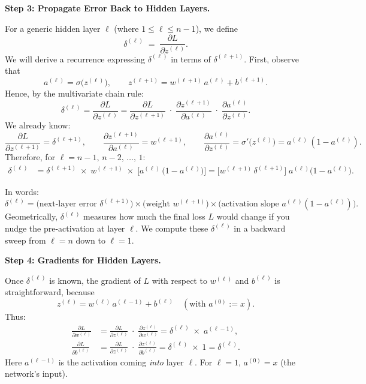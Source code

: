 \documentclass{article}
\begin{document}
\vspace{0.5em}
\noindent \textbf{Step 3: Propagate Error Back to Hidden Layers.}

For a generic hidden layer \(\ell\) (where \(1 \le \ell \le n-1\)), we define
\[
    \delta^{(\ell)} \;=\; \frac{\partial L}{\partial z^{(\ell)}}.
\]
We will derive a recurrence expressing \(\delta^{(\ell)}\) in terms of \(\delta^{(\ell+1)}\).  First, observe that
\[
    a^{(\ell)} = \sigma\bigl(z^{(\ell)}\bigr),
    \qquad
    z^{(\ell+1)} = w^{(\ell+1)}\,a^{(\ell)} + b^{(\ell+1)}.
\]
Hence, by the multivariate chain rule:
\[
    \delta^{(\ell)} 
    = \frac{\partial L}{\partial z^{(\ell)}} 
    = \frac{\partial L}{\partial z^{(\ell+1)}} 
      \;\cdot\; \frac{\partial z^{(\ell+1)}}{\partial a^{(\ell)}} 
      \;\cdot\; \frac{\partial a^{(\ell)}}{\partial z^{(\ell)}}.
\]
We already know:
\[
    \frac{\partial L}{\partial z^{(\ell+1)}} = \delta^{(\ell+1)}, 
    \qquad
    \frac{\partial z^{(\ell+1)}}{\partial a^{(\ell)}} 
    = w^{(\ell+1)},
    \qquad
    \frac{\partial a^{(\ell)}}{\partial z^{(\ell)}} 
    = \sigma'\bigl(z^{(\ell)}\bigr) 
    = a^{(\ell)}\,(1 - a^{(\ell)}).
\]
Therefore, for \(\ell = n-1,\,n-2,\,\dots,\,1\):
\begin{align}
    \delta^{(\ell)} 
    &= \delta^{(\ell+1)} \; \times\; w^{(\ell+1)} \; \times\; \bigl[a^{(\ell)}\,\bigl(1 - a^{(\ell)}\bigr)\bigr] 
    = \bigl[w^{(\ell+1)}\,\delta^{(\ell+1)}\bigr]\;a^{(\ell)}\bigl(1 - a^{(\ell)}\bigr).
    \label{eq:delta-hidden}
\end{align}

\noindent In words:
\[
    \delta^{(\ell)} = \bigl(\text{next-layer error } \delta^{(\ell+1)}\bigr) 
                     \times \bigl(\text{weight } w^{(\ell+1)}\bigr) 
                     \times \bigl(\text{activation slope } a^{(\ell)}(1 - a^{(\ell)})\bigr).
\]
Geometrically, \(\delta^{(\ell)}\) measures how much the final loss \(L\) would change if you nudge the pre-activation at layer \(\ell\).  We compute these \(\delta^{(\ell)}\) in a backward sweep from \(\ell = n\) down to \(\ell = 1\).

\vspace{0.5em}
\noindent \textbf{Step 4: Gradients for Hidden Layers.}

Once \(\delta^{(\ell)}\) is known, the gradient of \(L\) with respect to \(w^{(\ell)}\) and \(b^{(\ell)}\) is straightforward, because
\[
    z^{(\ell)} = w^{(\ell)}\,a^{(\ell-1)} + b^{(\ell)} \quad (\text{with }a^{(0)} := x).
\]
Thus:
\begin{align}
    \frac{\partial L}{\partial w^{(\ell)}} 
    &= \frac{\partial L}{\partial z^{(\ell)}} 
       \;\cdot\; \frac{\partial z^{(\ell)}}{\partial w^{(\ell)}} 
    = \delta^{(\ell)} \;\times\; a^{(\ell-1)}, 
    \label{eq:grad-wl} 
    \\
    \frac{\partial L}{\partial b^{(\ell)}} 
    &= \frac{\partial L}{\partial z^{(\ell)}} 
       \;\cdot\; \frac{\partial z^{(\ell)}}{\partial b^{(\ell)}} 
    = \delta^{(\ell)} \;\times\; 1 
    = \delta^{(\ell)}.
    \label{eq:grad-bl} 
\end{align}
Here \(a^{(\ell-1)}\) is the activation coming \emph{into} layer \(\ell\).  For \(\ell = 1\), \(a^{(0)} = x\) (the network's input).
\end{document}
